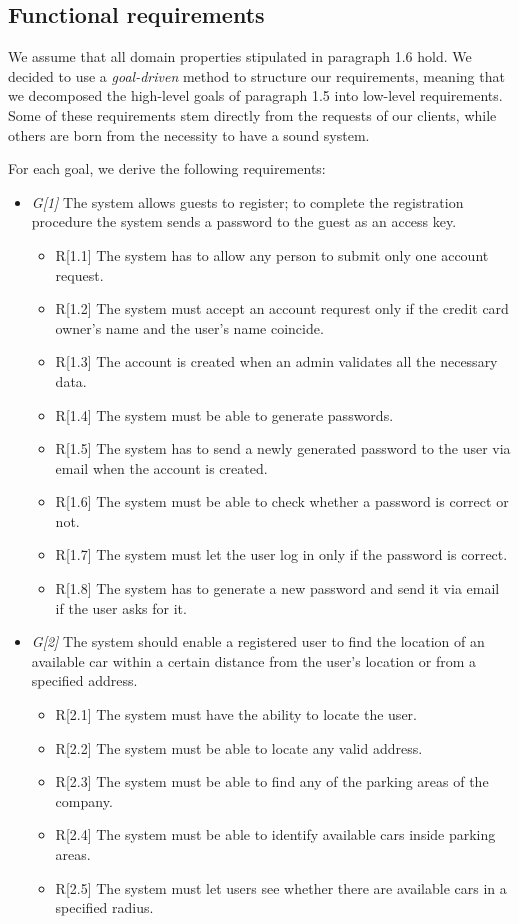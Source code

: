 
\subsection{Functional requirements}
We assume that all domain properties stipulated in paragraph 1.6 hold. We decided to use a \textit{goal-driven} method to structure our requirements, meaning that we decomposed the high-level goals of paragraph 1.5 into low-level requirements.
Some of these requirements stem directly from the requests of our clients, while others are born from the necessity to have a sound system.

For each goal, we derive the following requirements:



\begin{itemize}


				\item \textit{G[1]} The system allows guests to register; to complete the registration procedure the system sends a password to the guest as an access key.
					\begin{itemize}
						\item R[1.1] The system has to allow any person to submit only one account request.
						\item R[1.2] The system must accept an account requrest only if the credit card owner's name and the user's name coincide.
						\item R[1.3] The account is created when an admin validates all the necessary data.
						\item R[1.4] The system must be able to generate passwords.
						\item R[1.5] The system has to send a newly generated password to the user via email when the account is created.
						\item R[1.6] The system must be able to check whether a password is correct or not.
						\item R[1.7] The system must let the user log in only if the password is correct. 
						\item R[1.8] The system has to generate a new password and send it via email if the user asks for it.
					\end{itemize}

				\item \textit{G[2]} The system should enable a registered user to find the location of an available car within a certain distance from the user's location or from a specified address.
					\begin{itemize}
						\item R[2.1] The system must have the ability to locate the user.
						\item R[2.2] The system must be able to locate any valid address.
						\item R[2.3] The system must be able to find any of the parking areas of the company. 
						\item R[2.4] The system must be able to identify available cars inside parking areas.
						\item R[2.5] The system must let users see whether there are available cars in a specified radius. %
					\end{itemize}
					

\end{itemize}
